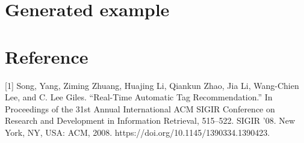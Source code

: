 \documentclass[12pt]{article} %
\begin{document}
\section*{Generated example}

\section{Reference}
{\setlength{\parindent}{0cm}
[1] Song, Yang, Ziming Zhuang, Huajing Li, Qiankun Zhao, Jia Li, Wang-Chien Lee, and C. Lee Giles. “Real-Time Automatic Tag Recommendation.” In Proceedings of the 31st Annual International ACM SIGIR Conference on Research and Development in Information Retrieval, 515–522. SIGIR ’08. New York, NY, USA: ACM, 2008. https://doi.org/10.1145/1390334.1390423.

} 
\end{document}

